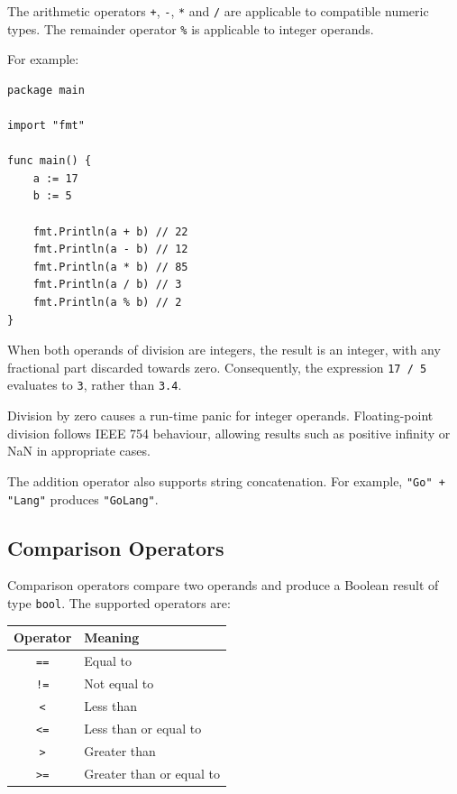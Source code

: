 The arithmetic operators \texttt{+}, \texttt{-}, \texttt{*}
and \texttt{/} are applicable to compatible numeric types.
The remainder operator \texttt{\%} is applicable to integer
operands.

For example:

\begin{lstlisting}
package main

import "fmt"

func main() {
    a := 17
    b := 5

    fmt.Println(a + b) // 22
    fmt.Println(a - b) // 12
    fmt.Println(a * b) // 85
    fmt.Println(a / b) // 3
    fmt.Println(a % b) // 2
}
\end{lstlisting}

When both operands of division are integers, the result is an
integer, with any fractional part discarded towards zero.
Consequently, the expression \texttt{17 / 5} evaluates to
\texttt{3}, rather than \texttt{3.4}.

Division by zero causes a run-time panic for integer operands.
Floating-point division follows IEEE 754 behaviour, allowing
results such as positive infinity or NaN in appropriate cases.

The addition operator also supports string concatenation.
For example, \texttt{"Go" + "Lang"} produces
\texttt{"GoLang"}.

\subsection{Comparison Operators}

Comparison operators compare two operands and produce a Boolean
result of type \texttt{bool}. The supported operators are:

\begin{center}
\begin{tabular}{|c|l|}
\hline
\textbf{Operator} & \textbf{Meaning} \\
\hline
\texttt{==} & Equal to \\
\texttt{!=} & Not equal to \\
\texttt{<} & Less than \\
\texttt{<=} & Less than or equal to \\
\texttt{>} & Greater than \\
\texttt{>=} & Greater than or equal to \\
\hline
\end{tabular}
\end{center}

